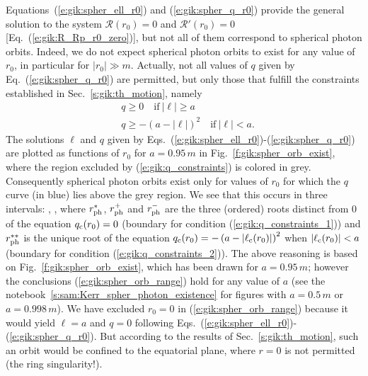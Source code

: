 Equations~(\ref{e:gik:spher_ell_r0}) and (\ref{e:gik:spher_q_r0}) provide
the general solution to the system $\mathcal{R}(r_0) = 0$ and $\mathcal{R}'(r_0) = 0$
[Eq.~(\ref{e:gik:R_Rp_r0_zero})], but not all
of them correspond to spherical photon orbits. Indeed, we do not expect
spherical photon orbits to exist for any value of $r_0$, in particular
for $|r_0|\gg m$. Actually, not all values of $q$ given by Eq.~(\ref{e:gik:spher_q_r0})
are permitted, but only those that fulfill the constraints established in
Sec.~\ref{s:gik:th_motion}, namely
\begin{subequations}
\label{e:gik:q_constraints}
\begin{align}
    & q \geq 0 \quad \mbox{if}\  |\ell| \geq a \label{e:gik:q_constraints_1}\\
    & q \geq - \left( a - |\ell| \right) ^2  \quad \mbox{if}\  |\ell| < a . \label{e:gik:q_constraints_2}
\end{align}
\end{subequations}
The solutions $\ell$ and $q$ given by Eqs.~(\ref{e:gik:spher_ell_r0})-(\ref{e:gik:spher_q_r0})
are plotted as functions of $r_0$ for $a=0.95\, m$
in Fig.~\ref{f:gik:spher_orb_exist}, where the
region excluded by (\ref{e:gik:q_constraints}) is colored in grey. Consequently
spherical photon orbits exist only for values of $r_0$ for which the $q$ curve
(in blue) lies above the grey region. We see that this occurs in three intervals:
\be \label{e:gik:spher_orb_range}
    \encadre{ r_0 \in [r_{\rm ph}^{**}, 0) },\quad
    \encadre{ r_0 \in (0, r_{\rm ph}^*] }
    \qand
    ,
\ee
where $r_{\rm ph}^*$, $r_{\rm ph}^+$ and $r_{\rm ph}^-$ are the three (ordered) roots
distinct from $0$ of the equation $q_{\rm c}(r_0) = 0$ (boundary for
condition (\ref{e:gik:q_constraints_1})) and $r_{\rm ph}^{**}$ is the unique
root of the equation $q_{\rm c}(r_0) = - \left( a - |\ell_{\rm c}(r_0)| \right) ^2$ when
$|\ell_{\rm c}(r_0)|  < a$ (boundary for condition (\ref{e:gik:q_constraints_2})).
The above reasoning is based on Fig.~\ref{f:gik:spher_orb_exist}, which has
been drawn for $a=0.95\, m$; however the conclusions (\ref{e:gik:spher_orb_range})
hold for any value of $a$ (see the notebook~\ref{s:sam:Kerr_spher_photon_existence}
for figures with $a=0.5\, m$ or $a=0.998\, m$). We have excluded $r_0=0$
in (\ref{e:gik:spher_orb_range}) because it would yield $\ell = a$ and $q=0$
following Eqs.~(\ref{e:gik:spher_ell_r0})-(\ref{e:gik:spher_q_r0}). But
according to the results of Sec.~\ref{s:gik:th_motion}, such an orbit
would be confined to the equatorial plane, where $r=0$ is not permitted (the ring singularity!).

